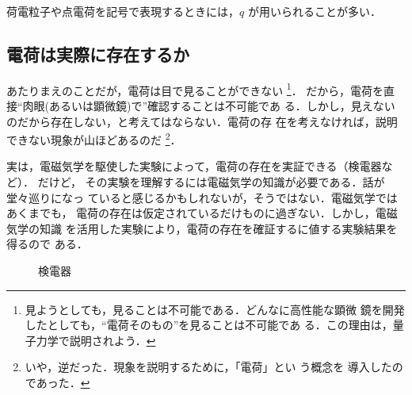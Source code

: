     荷電粒子や点電荷を記号で表現するときには，$q$ が用いられることが多い．


    \subsection{電荷は実際に存在するか}
    あたりまえのことだが，電荷は目で見ることができない
        \footnote{
            見ようとしても，見ることは不可能である．どんなに高性能な顕微
            鏡を開発したとしても，“電荷そのもの”を見ることは不可能であ
            る．この理由は，量子力学で説明されよう．
        }．
    だから，電荷を直接“肉眼(あるいは顕微鏡)で”確認することは不可能であ
    る．しかし，見えないのだから存在しない，と考えてはならない．電荷の存
    在を考えなければ，説明できない現象が山ほどあるのだ
        \footnote{
            いや，逆だった．現象を説明するために，「電荷」とい う概念を
            導入したのであった．
        }．

    実は，電磁気学を駆使した実験によって，電荷の存在を実証できる（検電器など）．
    だけど，
    その実験を理解するには電磁気学の知識が必要である．話が堂々巡りになっ
    ていると感じるかもしれないが，そうではない．電磁気学ではあくまでも，
    電荷の存在は仮定されているだけものに過ぎない．しかし，電磁気学の知識
    を活用した実験により，電荷の存在を確証するに値する実験結果を得るので
    ある．
        \begin{figure}[hbt]
            \begin{center}
                \caption{検電器}
                \label{fig:kendenki}
            \end{center}
        \end{figure}

